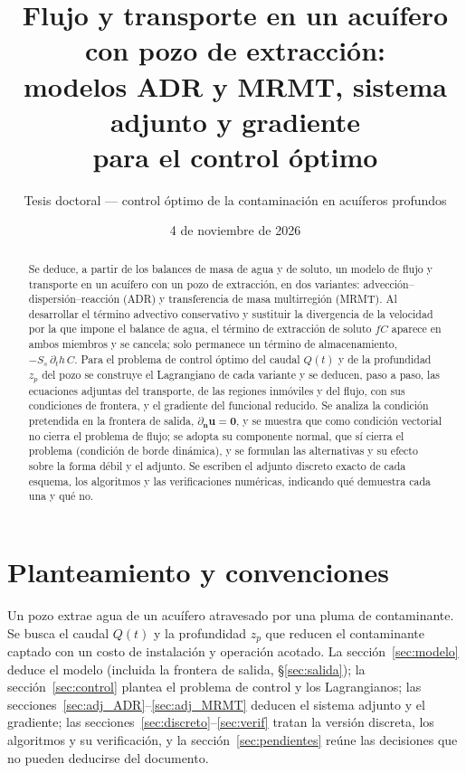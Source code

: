 \documentclass[11pt]{article}
\title{Flujo y transporte en un acuífero con pozo de extracción:\\
modelos ADR y MRMT, sistema adjunto y gradiente\\ para el control óptimo}
\author{Tesis doctoral --- control óptimo de la contaminación en acuíferos profundos}
\date{4 de noviembre de 2026}
\numberwithin{equation}{section}
\theoremstyle{plain}
\theoremstyle{definition}
\theoremstyle{remark}
\newcommand{\bu}{\mathbf{u}}
\newcommand{\bn}{\mathbf{n}}
\begin{document}
\maketitle

\begin{abstract}
Se deduce, a partir de los balances de masa de agua y de soluto, un modelo de flujo y
transporte en un acuífero con un pozo de extracción, en dos variantes: advección--dispersión--reacción
(ADR) y transferencia de masa multirregión (MRMT). Al desarrollar el término advectivo conservativo y
sustituir la divergencia de la velocidad por la que impone el balance de agua, el término de extracción de
soluto $fC$ aparece en ambos miembros y se cancela; solo permanece un término de almacenamiento,
$-S_s\,\partial_th\,C$. Para el problema de control óptimo del caudal $Q(t)$ y de la profundidad $z_p$ del pozo
se construye el Lagrangiano de cada variante y se deducen, paso a paso, las ecuaciones adjuntas del
transporte, de las regiones inmóviles y del flujo, con sus condiciones de frontera, y el gradiente del
funcional reducido. Se analiza la condición pretendida en la frontera de salida, $\partial_{\bn}\bu=\mathbf 0$, y se
muestra que como condición vectorial no cierra el problema de flujo; se adopta su componente normal, que sí cierra el problema (condición de borde dinámica), y se formulan las alternativas y su efecto sobre la forma débil y el adjunto. Se escriben el adjunto discreto exacto de cada
esquema, los algoritmos y las verificaciones numéricas, indicando qué demuestra cada una y qué no.
\end{abstract}

\section{Planteamiento y convenciones}
\label{sec:planteamiento}

Un pozo extrae agua de un acuífero atravesado por una pluma de contaminante. Se busca el caudal
$Q(t)$ y la profundidad $z_p$ que reducen el contaminante captado con un costo de instalación y operación
acotado. La sección~\ref{sec:modelo} deduce el modelo (incluida la frontera de salida,
\S\ref{sec:salida}); la sección~\ref{sec:control} plantea el problema de control y los Lagrangianos; las
secciones~\ref{sec:adj_ADR}--\ref{sec:adj_MRMT} deducen el sistema adjunto y el gradiente; las
secciones~\ref{sec:discreto}--\ref{sec:verif} tratan la versión discreta, los algoritmos y su verificación, y la
sección~\ref{sec:pendientes} reúne las decisiones que no pueden deducirse del documento.
\end{document}
